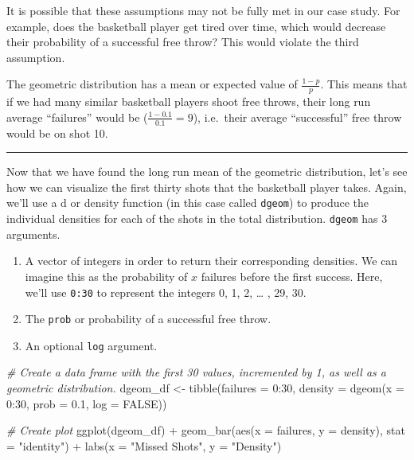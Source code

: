 \documentclass[
]{article}
\newenvironment{Shaded}{\begin{snugshade}}{\end{snugshade}}
\newcommand{\AttributeTok}[1]{\textcolor[rgb]{0.77,0.63,0.00}{#1}}
\newcommand{\CommentTok}[1]{\textcolor[rgb]{0.56,0.35,0.01}{\textit{#1}}}
\newcommand{\ConstantTok}[1]{\textcolor[rgb]{0.00,0.00,0.00}{#1}}
\newcommand{\DecValTok}[1]{\textcolor[rgb]{0.00,0.00,0.81}{#1}}
\newcommand{\FloatTok}[1]{\textcolor[rgb]{0.00,0.00,0.81}{#1}}
\newcommand{\FunctionTok}[1]{\textcolor[rgb]{0.00,0.00,0.00}{#1}}
\newcommand{\NormalTok}[1]{#1}
\newcommand{\OtherTok}[1]{\textcolor[rgb]{0.56,0.35,0.01}{#1}}
\newcommand{\SpecialCharTok}[1]{\textcolor[rgb]{0.00,0.00,0.00}{#1}}
\newcommand{\StringTok}[1]{\textcolor[rgb]{0.31,0.60,0.02}{#1}}
\begin{document}
It is possible that these assumptions may not be fully met in our case study. For example, does the basketball player get tired over time, which would decrease their probability of a successful free throw? This would violate the third assumption.

The geometric distribution has a mean or expected value of \(\frac{1-p}{p}\). This means that if we had many similar basketball players shoot free throws, their long run average ``failures'' would be (\(\frac{1-0.1}{0.1}=9\)), i.e.~their average ``successful'' free throw would be on shot 10.

\begin{center}\rule{0.5\linewidth}{0.5pt}\end{center}

Now that we have found the long run mean of the geometric distribution, let's see how we can visualize the first thirty shots that the basketball player takes. Again, we'll use a d or density function (in this case called \texttt{dgeom}) to produce the individual densities for each of the shots in the total distribution. \texttt{dgeom} has 3 arguments.

\begin{enumerate}
\def\labelenumi{\arabic{enumi}.}
\item
  A vector of integers in order to return their corresponding densities. We can imagine this as the probability of \(x\) failures before the first success. Here, we'll use \texttt{0:30} to represent the integers 0, 1, 2, \ldots{} , 29, 30.
\item
  The \texttt{prob} or probability of a successful free throw.
\item
  An optional \texttt{log} argument.
\end{enumerate}

\begin{Shaded}
\begin{Highlighting}[]
\CommentTok{\# Create a data frame with the first 30 values, incremented by 1, as well as a geometric distribution.}
\NormalTok{dgeom\_df }\OtherTok{\textless{}{-}} \FunctionTok{tibble}\NormalTok{(}\AttributeTok{failures =} \DecValTok{0}\SpecialCharTok{:}\DecValTok{30}\NormalTok{,}
                   \AttributeTok{density =} \FunctionTok{dgeom}\NormalTok{(}\AttributeTok{x =} \DecValTok{0}\SpecialCharTok{:}\DecValTok{30}\NormalTok{, }\AttributeTok{prob =} \FloatTok{0.1}\NormalTok{, }\AttributeTok{log =} \ConstantTok{FALSE}\NormalTok{))}

\CommentTok{\# Create plot}
\FunctionTok{ggplot}\NormalTok{(dgeom\_df) }\SpecialCharTok{+}
  \FunctionTok{geom\_bar}\NormalTok{(}\FunctionTok{aes}\NormalTok{(}\AttributeTok{x =}\NormalTok{ failures, }\AttributeTok{y =}\NormalTok{ density), }\AttributeTok{stat =} \StringTok{"identity"}\NormalTok{) }\SpecialCharTok{+}
  \FunctionTok{labs}\NormalTok{(}\AttributeTok{x =} \StringTok{"Missed Shots"}\NormalTok{, }\AttributeTok{y =} \StringTok{"Density"}\NormalTok{)}
\end{Highlighting}
\end{Shaded}
\end{document}
